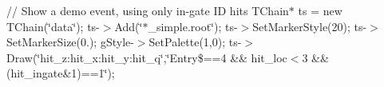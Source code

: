 // Show a demo event, using only in-\/gate ID hits TChain$\ast$ ts = new TChain(\char`\"{}data\char`\"{}); ts-\/$>$Add(\char`\"{}$\ast$\+\_\+simple.\+root\char`\"{}); ts-\/$>$Set\+Marker\+Style(20); ts-\/$>$Set\+Marker\+Size(0.); g\+Style-\/$>$Set\+Palette(1,0); ts-\/$>$Draw(\char`\"{}hit\+\_\+z\+:hit\+\_\+x\+:hit\+\_\+y\+:hit\+\_\+q\char`\"{},\char`\"{}\+Entry\$==4 \&\& hit\+\_\+loc$<$3 \&\& (hit\+\_\+ingate\&1)==1\char`\"{}); 